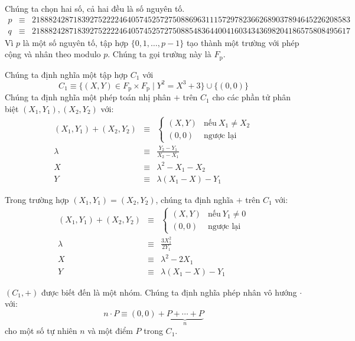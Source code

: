 \documentclass[9pt,oneside]{amsart}
\begin{document}
Chúng ta chọn hai số, cả hai đều là số nguyên tố.
\begin{eqnarray}
p &\equiv& 21888242871839275222246405745257275088696311157297823662689037894645226208583 \\
q &\equiv& 21888242871839275222246405745257275088548364400416034343698204186575808495617
\end{eqnarray}
Vì $p$ là một số nguyên tố, tập hợp $\{0, 1, \ldots, p - 1\}$ tạo thành một trường với phép cộng và nhân theo modulo $p$. Chúng ta gọi trường này là $F_{\mathrm{p}}$.

Chúng ta định nghĩa một tập hợp $C_1$ với
\begin{equation}
C_1\equiv\{(X,Y)\in F_{\mathrm{p}}\times F_{\mathrm{p}}\mid Y^2=X^3+3\}\cup\{(0,0)\}
\end{equation}
Chúng ta định nghĩa một phép toán nhị phân $+$ trên $C_1$ cho các phần tử phân biệt $(X_1, Y_1), (X_2, Y_2)$ với:
\begin{eqnarray}\label{eq:ec-addition}
(X_1, Y_1) + (X_2, Y_2)&\equiv&\begin{cases}
(X,Y)&\text{nếu}\ X_1\neq X_2\\
(0,0)&\text{ngược lại}
\end{cases}\\
\nonumber \lambda&\equiv&\frac{Y_2-Y_1}{X_2-X_1}\\
\nonumber X&\equiv&\lambda^2-X_1-X_2\\
\nonumber Y&\equiv&\lambda(X_1-X)-Y_1
\end{eqnarray}

Trong trường hợp $(X_1, Y_1) = (X_2, Y_2)$, chúng ta định nghĩa $+$ trên $C_1$ với:
\begin{eqnarray}\label{eq:ec-doubling}
(X_1, Y_1) + (X_2, Y_2)&\equiv&\begin{cases}
(X,Y)&\text{nếu}\ Y_1\neq 0\\
(0,0)&\text{ngược lại}
\end{cases}\\
\nonumber \lambda&\equiv&\frac{3X_1^2}{2Y_1}\\
\nonumber X&\equiv&\lambda^2-2X_1\\
\nonumber Y&\equiv&\lambda(X_1-X)-Y_1
\end{eqnarray}

$(C_1,+)$ được biết đến là một nhóm. Chúng ta định nghĩa phép nhân vô hướng $\cdot$ với:
\begin{equation}\label{eq:ec-scalar-multiplication}
n\cdot P\equiv(0,0)+\underbrace{P+\cdots+P}_{n}
\end{equation}
cho một số tự nhiên $n$ và một điểm $P$ trong $C_1$.
\end{document}
